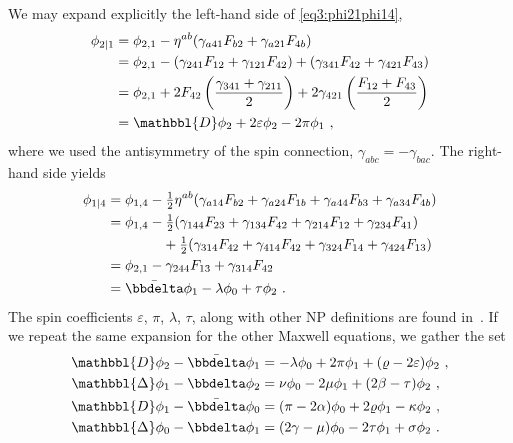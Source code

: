 We may expand explicitly the left-hand side of \eqref{eq3:phi21phi14},
\begin{align}
    \label{eq3:phi21SpinCoef}
    \begin{split}
        \phi_{2\rvert 1} &= \phi_{2, 1} - \eta^{ab}( \gamma_{a41} F_{b2} + \gamma_{a21} F_{4b} ) \\
        &= \phi_{2, 1} - (\gamma_{241} F_{12} + \gamma_{121} F_{42}) + ( \gamma_{341} F_{42} + \gamma_{421} F_{43} ) \\
        &= \phi_{2, 1} + 2 F_{42} \left(\frac{\gamma_{341} + \gamma_{211}}{2}\right) + 2 \gamma_{421} \left(\frac{F_{12} + F_{43}}{2}\right) \\
        &= \mathbbl{D} \phi_2 + 2 \varepsilon \phi_2 - 2 \pi \phi_1 ~,
    \end{split}
\end{align}
where we used the antisymmetry of the spin connection, $\gamma_{abc}=-\gamma_{bac}$. The right-hand side yields
\begin{align}
    \label{eq3:phi14SpinCoef}
    \begin{split}
        \phi_{1\rvert 4} &= \phi_{1, 4} - \tfrac{1}{2} \eta^{ab}( \gamma_{a14} F_{b2} + \gamma_{a24} F_{1b} + \gamma_{a44} F_{b3} + \gamma_{a34} F_{4b} ) \\
        &= \phi_{1, 4} - \tfrac{1}{2} ( \gamma_{144} F_{23} + \gamma_{134} F_{42} + \gamma_{214} F_{12} + \gamma_{234} F_{41} ) \\ 
        &\qquad\qquad + \tfrac{1}{2} ( \gamma_{314} F_{42} + \gamma_{414} F_{42} + \gamma_{324} F_{14} + \gamma_{424} F_{13} ) \\
        &= \phi_{2, 1} - \gamma_{244} F_{13} + \gamma_{314} F_{42} \\
        &= \bar{\bbdelta} \phi_1 - \lambda \phi_0 + \tau \phi_2  ~.
    \end{split}
\end{align}
The spin coefficients $\varepsilon$, $\pi$, $\lambda$, $\tau$, along with other NP definitions are found in~. If we repeat the same expansion for the other Maxwell equations, we gather the set
\begin{subequations}
    \begin{align}
        \label{eq3:phi21phi14SpinCoef}
        \mathbbl{D} \phi_2 - \bar{\bbdelta} \phi_1 &= -\lambda \phi_0 + 2 \pi \phi_1 + (\varrho - 2 \varepsilon) \phi_2 ~,\\
        \label{eq3:phi12phi23SpinCoef}
        \mathbbl{\Delta} \phi_1 - \bbdelta \phi_2 &= \nu \phi_0 - 2 \mu \phi_1 + (2\beta-\tau) \phi_2 ~,\\
        \label{eq3:phi11phi04SpinCoef}
        \mathbbl{D} \phi_1 - \bar{\bbdelta} \phi_0 &= (\pi - 2 \alpha) \phi_0 + 2 \varrho \phi_1 - \kappa \phi_2 ~,\\
        \label{eq3:phi02phi13SpinCoef}
        \mathbbl{\Delta} \phi_0 - \bbdelta \phi_1 &= (2 \gamma - \mu) \phi_0 - 2 \tau \phi_1 + \sigma \phi_2 ~.
    \end{align}
\end{subequations}
